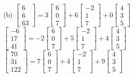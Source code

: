 \documentclass[addpoints]{exam}
\begin{document}
\begin{sloppypar}
\begin{questions}
\begin{solution}
        (b) $ \begin{bmatrix}
            6 \\ 6 \\ 63
        \end{bmatrix} = 3\begin{bmatrix}
            6 \\ 0 \\ 7
        \end{bmatrix} + 6\begin{bmatrix}
            -2 \\ 1 \\ 7
        \end{bmatrix} + 0\begin{bmatrix}
            4 \\ 3 \\ 5
        \end{bmatrix}$ \\ 
        $ \begin{bmatrix}
            -6 \\ 17 \\ 41
        \end{bmatrix} = -2\begin{bmatrix}
            6 \\ 0 \\ 7
        \end{bmatrix} + 5\begin{bmatrix}
            -2 \\ 1 \\ 7
        \end{bmatrix} + 4\begin{bmatrix}
            4 \\ 3 \\ 5
        \end{bmatrix}$ \\ 
        $ \begin{bmatrix}
            70 \\ 31 \\ 122
        \end{bmatrix} = 7\begin{bmatrix}
            6 \\ 0 \\ 7
        \end{bmatrix} + 4\begin{bmatrix}
            -2 \\ 1 \\ 7
        \end{bmatrix} + 9\begin{bmatrix}
            4 \\ 3 \\ 5
        \end{bmatrix}$
    \end{solution}


\end{questions}
\end{sloppypar}
\end{document}
